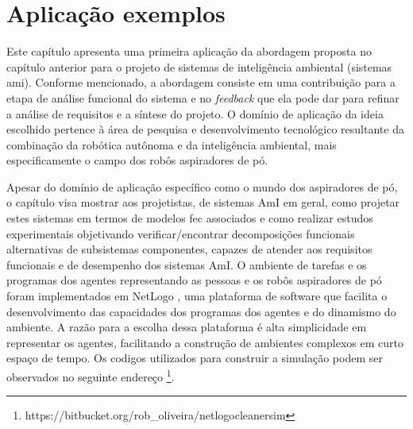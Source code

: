\chapter{Aplicação exemplos}
\label{cap:resultados}



Este capítulo apresenta uma primeira aplicação da abordagem proposta no capítulo anterior para o projeto de sistemas de inteligência ambiental (sistemas \acrshort{ami}). Conforme mencionado, a abordagem consiste em uma contribuição para a etapa de análise funcional do sistema e no \textit{feedback} que ela pode dar para refinar a análise de requisitos e a síntese do projeto. O domínio de aplicação da ideia escolhido pertence à área de pesquisa e desenvolvimento tecnológico resultante da combinação da robótica autônoma e da inteligência ambiental, mais especificamente o campo dos robôs aspiradores de pó.

Apesar do domínio de aplicação específico como o mundo dos aspiradores de pó, o capítulo visa mostrar aos projetistas, de sistemas AmI em geral, como projetar estes sistemas em termos de modelos \acrshort{fec} associados e como realizar estudos experimentais objetivando verificar/encontrar decomposições funcionais alternativas de subsistemas componentes, capazes de atender aos requisitos funcionais e de desempenho dos sistemas AmI. O ambiente de tarefas e os programas dos agentes representando as pessoas e os robôs aspiradores de pó foram implementados em NetLogo \cite{wilensky1999netlogo}, uma plataforma de software que facilita o desenvolvimento das capacidades dos programas dos agentes e do dinamismo do ambiente. A razão para a escolha dessa plataforma é alta simplicidade em representar os agentes, facilitando a construção de ambientes complexos em curto espaço de tempo. Os codigos utilizados para construir a simulação podem ser observados no seguinte endereço \footnote{https://bitbucket.org/rob\_oliveira/netlogocleanersim}.


